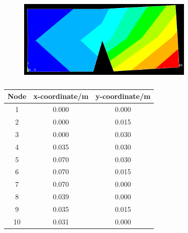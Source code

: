 \documentclass[11pt]{article}
\begin{document}
\begin{figure}[H]
    \centering
    \includegraphics[width = 0.75\textwidth]{img/fig9.png}
    \caption{}
    \label{fig:case4}
\end{figure}
\begin{table}[H]
    \centering
    \begin{tabular}{@{}S[table-format=2.0]S[table-format=1.3]S[table-format=1.3]@{}}
        \toprule
        \textbf{Node} & \textbf{x-coordinate/m} & \textbf{y-coordinate/m} \\
                     & 0.000                   & 0.000                   \\
        2             & 0.000                   & 0.015                   \\
        3             & 0.000                   & 0.030                   \\
        4             & 0.035                   & 0.030                   \\
        5             & 0.070                   & 0.030                   \\
        6             & 0.070                   & 0.015                   \\
        7             & 0.070                   & 0.000                   \\
        8             & 0.039                   & 0.000                   \\
        9             & 0.035                   & 0.015                   \\
        10            & 0.031                   & 0.000                   \\
        \bottomrule
    \end{tabular}
    \caption{}
    \label{nodeGeom}
\end{table}
\end{document}

